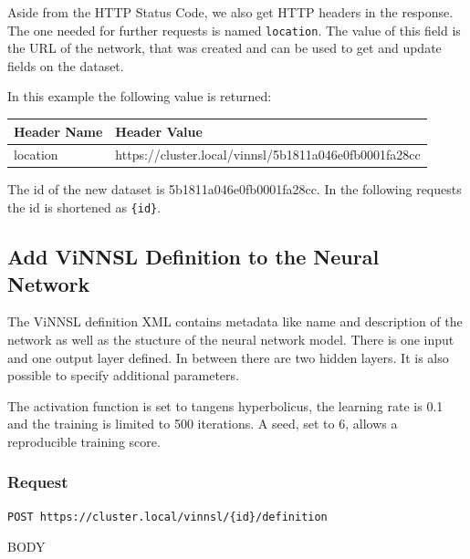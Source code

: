 Aside from the HTTP Status Code, we also get HTTP headers in the
response. The one needed for further requests is named
\texttt{location}. The value of this field is the URL of the network,
that was created and can be used to get and update fields on the
dataset.

In this example the following value is returned:

\begin{longtable}[]{@{}ll@{}}
\toprule
Header Name & Header Value\tabularnewline
\midrule
\endhead
location &
https://cluster.local/vinnsl/5b1811a046e0fb0001fa28cc\tabularnewline
\bottomrule
\end{longtable}

The id of the new dataset is 5b1811a046e0fb0001fa28cc. In the following
requests the id is shortened as \texttt{\{id\}}.

\subsection{Add ViNNSL Definition to the Neural
Network}\label{add-vinnsl-definition-to-the-neural-network}

The ViNNSL definition XML contains metadata like name and description of
the network as well as the stucture of the neural network model. There
is one input and one output layer defined. In between there are two
hidden layers. It is also possible to specify additional parameters.

The activation function is set to tangens hyperbolicus, the learning
rate is 0.1 and the training is limited to 500 iterations. A seed, set
to 6, allows a reproducible training score.

\subsubsection{Request}\label{request-1}

\begin{verbatim}
POST https://cluster.local/vinnsl/{id}/definition
\end{verbatim}

BODY

